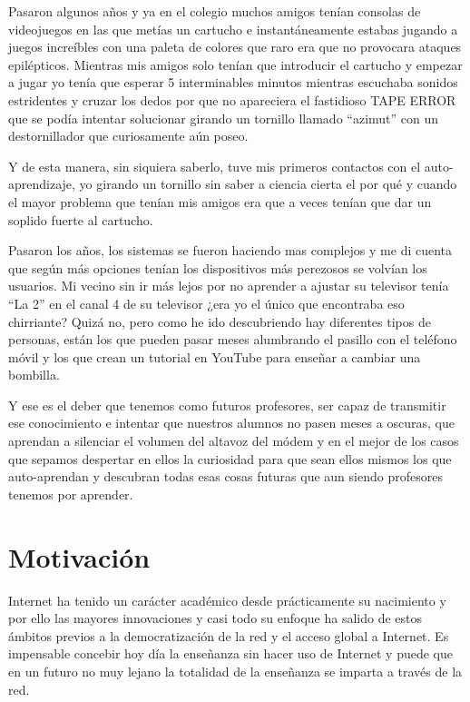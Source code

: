 \bigskip
Pasaron algunos años y ya en el colegio muchos amigos tenían consolas de videojuegos en las que metías un cartucho e instantáneamente estabas jugando a juegos increíbles con una paleta de colores que raro era que no provocara ataques epilépticos. Mientras mis amigos solo tenían que introducir el cartucho y empezar a jugar yo tenía que esperar 5 interminables minutos mientras escuchaba sonidos estridentes y cruzar los dedos por que no apareciera el fastidioso TAPE ERROR que se podía intentar solucionar girando un tornillo llamado ``azimut'' con un destornillador que curiosamente aún poseo.

\bigskip
Y de esta manera, sin siquiera saberlo, tuve mis primeros contactos con el auto-aprendizaje, yo girando un tornillo sin saber a ciencia cierta el por qué y cuando el mayor problema que tenían mis amigos era que a veces tenían que dar un soplido fuerte al cartucho.

\bigskip
Pasaron los años, los sistemas se fueron haciendo mas complejos y me di cuenta que según más opciones tenían los dispositivos más perezosos se volvían los usuarios. Mi vecino sin ir más lejos por no aprender a ajustar su televisor tenía ``La 2'' en el canal 4 de su televisor ¿era yo el único que encontraba eso chirriante? Quizá no, pero como he ido descubriendo hay diferentes tipos de personas, están los que pueden pasar meses alumbrando el pasillo con el teléfono móvil y los que crean un tutorial en YouTube para enseñar a cambiar una bombilla.

\bigskip
Y ese es el deber que tenemos como futuros profesores, ser capaz de transmitir ese conocimiento e intentar que nuestros alumnos no pasen meses a oscuras, que aprendan a silenciar el volumen del altavoz del módem y en el mejor de los casos que sepamos despertar en ellos la curiosidad para que sean ellos mismos los que auto-aprendan y descubran todas esas cosas futuras que aun siendo profesores tenemos por aprender.

\section{Motivación}

Internet ha tenido un carácter académico desde prácticamente su nacimiento y por ello las mayores innovaciones y casi todo su enfoque ha salido de estos ámbitos previos a la democratización de la red y el acceso global a Internet. Es impensable concebir hoy día la enseñanza sin hacer uso de Internet y puede que en un futuro no muy lejano la totalidad de la enseñanza se imparta a través de la red.

